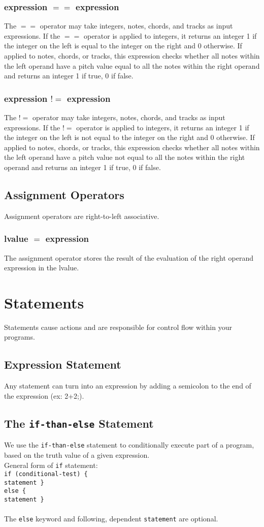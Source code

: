 \documentclass[letterpaper]{article}
\begin{document}
\subsubsection{expression $==$ expression}
The $==$ operator may take integers, notes, chords, and tracks as input expressions. If the $==$ operator is applied to integers, it returns an integer 1 if the integer on the left is equal to the integer on the right and 0 otherwise. If applied to notes, chords, or tracks, this expression checks whether all notes within the left operand have a pitch value equal to all the notes within the right operand and returns an integer 1 if true, 0 if false.
\subsubsection{expression $!=$ expression}
The $!=$ operator may take integers, notes, chords, and tracks as input expressions. If the $!=$ operator is applied to integers, it returns an integer 1 if the integer on the left is not equal to the integer on the right and 0 otherwise. If applied to notes, chords, or tracks, this expression checks whether all notes within the left operand have a pitch value not equal to all the notes within the right operand and returns an integer 1 if true, 0 if false.
\subsection{Assignment Operators}
Assignment operators are right-to-left associative.
\subsubsection{lvalue $=$ expression}
The assignment operator stores the result of the evaluation of the right operand expression in the lvalue. 

\section{Statements}
Statements cause actions and are responsible for control flow within your programs.
\subsection{Expression Statement}
Any statement can turn into an expression by adding a semicolon to the end of the expression (ex: 2+2;). 
\subsection{The \texttt{if-than-else} Statement}
We use the \texttt{if-than-else} statement to conditionally execute part of a program, based on the truth value of a given expression.\\
General form of \texttt{if} statement:  \\
\texttt{if (conditional-test) \{ \\
statement \} \\
else \{ \\
statement \} } \\ \\
The \texttt{else} keyword and following, dependent \texttt{statement} are optional.
\end{document}

